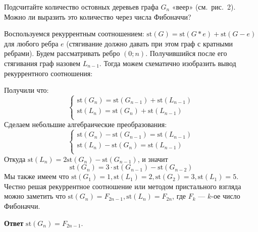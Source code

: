 \documentclass[a4paper,12pt,twoside]{article}
\begin{document}
\begin{?}
    Подсчитайте количество остовных деревьев графа $G_n$ «веер» (см.~рис.~2). Можно ли выразить это количество через числа Фибоначчи?
    \begin{figure}[H]
        \centering
    \end{figure}
\end{?}
\begin{solution}{}
    Воспользуемся рекуррентным соотношением: $\mathrm{st}(G) = \mathrm{st}(G \ast e) + \mathrm{st}(G - e)$ для любого ребра $e$ (стягивание должно давать при этом граф с кратными ребрами). Будем рассматривать ребро $(0; n)$. Получившийся после его стягивания граф назовем $L_{n-1}$.  Тогда можем схематично изобразить вывод рекуррентного соотношения:

    \vspace{12pt}

    \begin{center}
    \end{center}

    \vspace{12pt}

    \noindent Получили что:
    \[
        \begin{cases}
            \mathrm{st}(G_n) = \mathrm{st}(G_{n-1}) + \mathrm{st}(L_{n-1}) \\
            \mathrm{st}(L_n) = \mathrm{st}(G_{n}) + \mathrm{st}(L_{n-1}) \\
        \end{cases}
    \]
    Сделаем небольшие алгебраические преобразования:
    \[
        \begin{cases}
            \mathrm{st}(G_n) - \mathrm{st}(G_{n-1}) = \mathrm{st}(L_{n-1}) \\
            \mathrm{st}(L_n) - \mathrm{st}(G_{n}) = \mathrm{st}(L_{n-1}) \\
        \end{cases}
    \]
    Откуда \(\mathrm{st}(L_n) = 2 \mathrm{st}(G_n) - \mathrm{st}(G_{n-1})\), и значит
    \[
        \mathrm{st}(G_n) = 3 \cdot \mathrm{st}(G_{n-1}) - \mathrm{st}(G_{n-2})
    \] 
    Мы также имеем что $\mathrm{st}(G_1) = 1, \mathrm{st}(L_1) = 2, \mathrm{st}(G_2) = 3,  \mathrm{st}(L_1) = 5$. Честно решая рекуррентное соотношение или методом пристального взгляда можно заметить что $\mathrm{st}(G_n) = F_{2n - 1}, \mathrm{st}(L_n) = F_{2n}$, где $F_{k}$ --- $k$-ое число Фибоначчи.
    
    \noindent\textbf{Ответ} $\mathrm{st}(G_n) = F_{2n - 1}$.
\end{solution}
\end{document}
